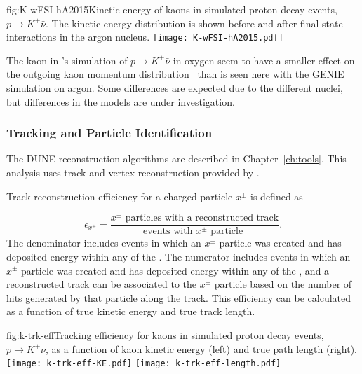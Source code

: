 \begin{dunefigure}{fig:K-wFSI-hA2015}{Kinetic energy of kaons in simulated proton decay events, $p\rightarrow K^{+} \bar{\nu}$.  The kinetic energy distribution is shown before and after final state interactions in the argon nucleus.}
\texttt{[image: K-wFSI-hA2015.pdf]}
\end{dunefigure}

The kaon  in \superk's simulation of $p\rightarrow K^{+} \bar{\nu}$ in oxygen seem to have a smaller effect on the outgoing kaon momentum distribution~\cite{Abe:2014mwa} than is seen here with the GENIE simulation on argon.  Some differences are expected due to the different nuclei, but differences in the  models are under investigation.

\subsubsection{Tracking and Particle Identification}
\label{sec:event-reconstruction}

The DUNE reconstruction algorithms are described in Chapter~\ref{ch:tools}.  This analysis uses \threed track and vertex reconstruction provided by .

Track reconstruction efficiency for a charged particle $x^{\pm}$ is defined as 

\begin{equation}
\epsilon_{x^{\pm}} = \frac{\mbox{$x^{\pm}$ particles with a reconstructed track}}{\mbox{events with $x^{\pm}$ particle }}.
\end{equation}
The denominator includes events in which an $x^{\pm}$ particle was created and has deposited energy within any of the .  The numerator includes events in which an $x^{\pm}$ particle was created and has deposited energy within any of the , and a reconstructed track can be associated to the $x^{\pm}$ particle based on the number of hits generated by that particle along the track. This efficiency can be calculated as a function of true kinetic energy and true track length.

\begin{dunefigure}{fig:k-trk-eff}{Tracking efficiency for kaons in simulated proton decay events, $p\rightarrow K^{+} \bar{\nu}$, as a function of kaon kinetic energy (left) and true path length (right).}
\texttt{[image: k-trk-eff-KE.pdf]}
\texttt{[image: k-trk-eff-length.pdf]}
\end{dunefigure}


